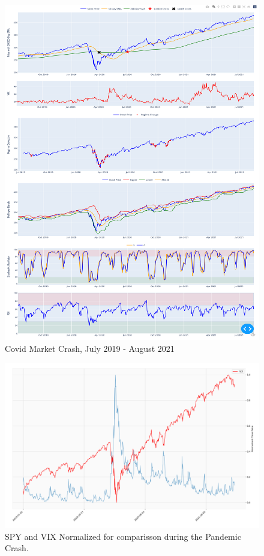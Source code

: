 \documentclass[conference]{IEEEtran}
\begin{document}
\begin{figure}[h]
    \centering
    \includegraphics[width=\textwidth]{Figure_04.png}
    \caption{Covid Market Crash, July 2019 - August 2021}
    \label{fig:fig4}
\end{figure}

\begin{figure}[h]
    \centering
    \includegraphics[width=\textwidth]{Figure_05.png}
    \caption{SPY and VIX Normalized for comparisson during the Pandemic Crash.}
    \label{fig:fig5}
\end{figure}
\end{document}
